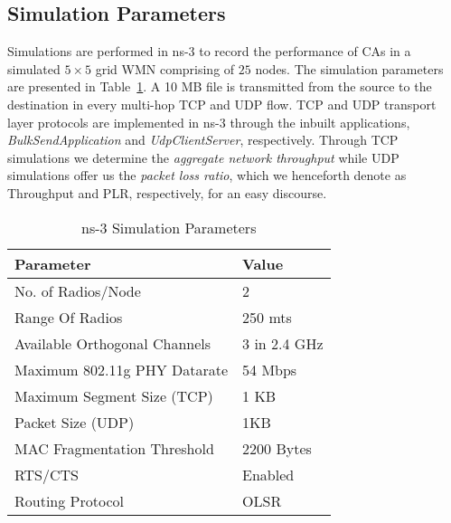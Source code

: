 \documentclass[conference]{IEEEtran}
\begin{document}
\subsection{Simulation Parameters}
Simulations are performed in ns-3 \cite{NS-3} to record the performance of CAs in a simulated $5\times5$ grid WMN comprising of $25$ nodes. The simulation parameters are presented in Table~\ref{sim}. A 10 MB file is transmitted from the source to the destination in every multi-hop TCP and UDP flow. TCP and UDP transport layer protocols are implemented in \mbox{ns-3} through the inbuilt applications, \textit{BulkSendApplication} and \textit{UdpClientServer}, respectively. Through TCP simulations we determine the \textit{aggregate network throughput} while UDP simulations offer us the \textit{packet loss ratio}, which we henceforth denote as Throughput and PLR, respectively, for an easy discourse. 
\begin{table} [h!]
\caption{ns-3 Simulation Parameters}
\center 
\begin{tabular}{|p{5cm}|p{3cm}|}
\hline
\bfseries
 Parameter&\bfseries Value \\ [0.2ex]
 \hline
\hline
No. of Radios/Node&2   \\
\hline
Range Of Radios&250 mts   \\
\hline
Available Orthogonal Channels&3 in 2.4 GHz  \\
\hline
Maximum 802.11g PHY Datarate &54 Mbps  \\
\hline
Maximum Segment Size (TCP)&1 KB   \\
\hline
Packet Size (UDP)&1KB\\
\hline
MAC Fragmentation Threshold&2200 Bytes  \\
\hline
RTS/CTS &Enabled  \\
\hline
Routing Protocol &OLSR    \\
\hline
\end{tabular}
\label{sim}
\end{table}     
\end{document}
